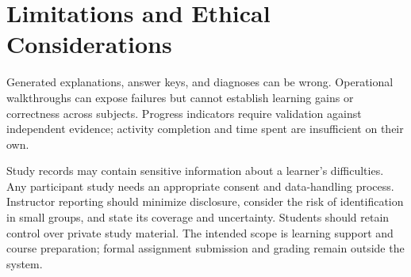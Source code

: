 \section{Limitations and Ethical Considerations}
\label{sec:limitations}

Generated explanations, answer keys, and diagnoses can be wrong.
Operational walkthroughs can expose failures but cannot establish
learning gains or correctness across subjects. Progress indicators
require validation against independent evidence; activity completion
and time spent are insufficient on their own.

Study records may contain sensitive information about a learner's
difficulties. Any participant study needs an appropriate consent and
data-handling process. Instructor reporting should minimize disclosure,
consider the risk of identification in small groups, and state its
coverage and uncertainty. Students should retain control over private
study material. The intended scope is learning support and course
preparation; formal assignment submission and grading remain outside
the system.
